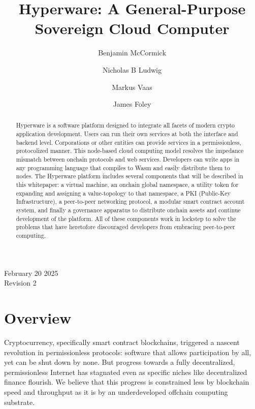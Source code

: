 \documentclass[runningheads]{llncs}
\begin{document}
%
\title{Hyperware: A General-Purpose Sovereign Cloud Computer}
%
%
\author{
Benjamin McCormick \and
Nicholas B Ludwig \and
Markus Vaas \and
James Foley
}
%
\maketitle %
%
\begin{abstract}
Hyperware is a software platform designed to integrate all facets of modern crypto application development.
Users can run their own services at both the interface and backend level.
Corporations or other entities can provide services in a permissionless, protocolized manner.
This node-based cloud computing model resolves the impedance mismatch between onchain protocols and web services.
Developers can write apps in any programming language that compiles to Wasm and easily distribute them to nodes.
The Hyperware platform includes several components that will be described in this whitepaper: a virtual machine, an onchain global namespace, a utility token for expanding and assigning a value-topology to that namespace, a PKI (Public-Key Infrastructure), a peer-to-peer networking protocol, a modular smart contract account system, and finally a governance apparatus to distribute onchain assets and continue development of the platform.
All of these components work in lockstep to solve the problems that have heretofore discouraged developers from embracing peer-to-peer computing.
\end{abstract}
\vspace*{\fill}
\begin{center}
February 20 2025\\
Revision 2
\end{center}
%
\tableofcontents
%
%
%
%
\section{Overview}
\label{sec:overview}

Cryptocurrency, specifically smart contract blockchains, triggered a nascent revolution in permissionless protocols: software that allows participation by all, yet can be shut down by none.
But progress towards a fully decentralized, permissionless Internet has stagnated even as specific niches like decentralized finance flourish.
We believe that this progress is constrained less by blockchain speed and throughput as it is by an underdeveloped offchain computing substrate.
\end{document}
